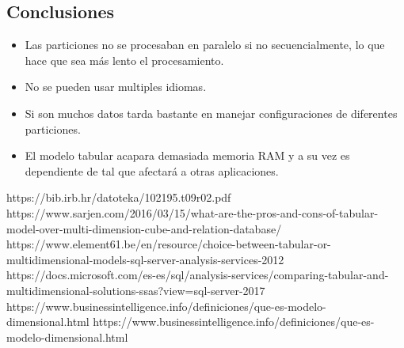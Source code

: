 \documentclass[preprint,12pt]{elsarticle}
\begin{document}
\subsection{Conclusiones}

\begin{itemize}
	\item Las particiones no se procesaban en paralelo si no secuencialmente, lo que hace que sea más lento el procesamiento.
	\item No se pueden usar multiples idiomas.
	\item Si son muchos datos tarda bastante en manejar configuraciones de diferentes particiones.
	\item El modelo tabular acapara demasiada memoria RAM y a su vez es dependiente de tal que afectará a otras aplicaciones.
\end{itemize}



	
	

	
	\newpage
	
	   \begin{thebibliography}{0}
               https://bib.irb.hr/datoteka/102195.t09r02.pdf 
                  https://www.sarjen.com/2016/03/15/what-are-the-pros-and-cons-of-tabular-model-over-multi-dimension-cube-and-relation-database/
                  https://www.element61.be/en/resource/choice-between-tabular-or-multidimensional-models-sql-server-analysis-services-2012
                   https://docs.microsoft.com/es-es/sql/analysis-services/comparing-tabular-and-multidimensional-solutions-ssas?view=sql-server-2017
  https://www.businessintelligence.info/definiciones/que-es-modelo-dimensional.html
                     https://www.businessintelligence.info/definiciones/que-es-modelo-dimensional.html


         \end{thebibliography}
	
\end{document}

